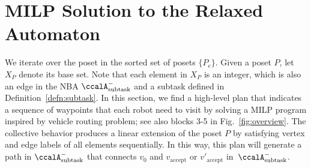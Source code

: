 \documentclass[Afour,sageh,times]{sagej}
\newtheorem{exmp}{Example}
\newcommand{\auto}[1]{\ccalA_{\text{#1}}}
\newenvironment{cexmp}
{\addtocounter{exmp}{-1}\begin{exmp}}
  {\end{exmp}}
\begin{document}
\section{MILP Solution to the Relaxed Automaton}\label{sec:solution}
We iterate over the poset in the  sorted set of posets  $\{P_e\}$. Given a poset $P$, let $X_{P}$ denote its base set. Note that each element in $X_P$ is an integer, which is also an edge in the NBA $\auto{subtask}^-$ and a subtask defined in Definition~\ref{defn:subtask}. In this section, we find a high-level plan that indicates  a sequence of waypoints that each robot need to visit by solving a MILP program inspired by vehicle routing problem; see also blocks 3-5 in Fig.~\ref{fig:overview}. The collective behavior produces a linear extension of the poset $P$ by satisfying vertex and edge labels of all elements sequentially. In this way,  this plan will generate a path in $\auto{subtask}^-$ that connects $v_0$ and $v_{\text{accept}}$ or $v'_{\text{accept}}$ in~$\auto{subtask}^-$.
\end{document}
